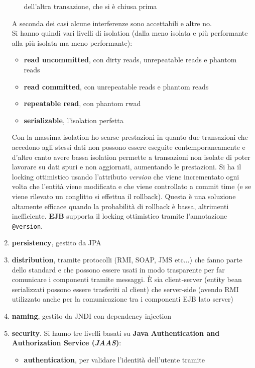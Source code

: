 \documentclass[a4paper,12pt, oneside]{book}
\begin{document}
\begin{enumerate}
\begin{itemize}
    dell'altra transazione, che si è chiusa prima 
  \end{itemize}
  A seconda dei casi alcune interferenze sono accettabili e altre no.\\
  Si hanno quindi vari livelli di isolation (dalla meno isolata e più
  performante alla più isolata ma meno performante):
  \begin{itemize}
    \item \textbf{read uncommitted}, con dirty reads, unrepeatable reads e
    phantom reads 
    \item \textbf{read committed}, con unrepeatable reads e phantom reads 
    \item \textbf{repeatable read}, con phantom rwad
    \item \textbf{serializable}, l'isolation perfetta
  \end{itemize}
  Con la massima isolation ho scarse prestazioni in quanto due transazioni che
  accedono agli stessi dati non possono essere eseguite contemporaneamente e
  d'altro canto avere bassa isolation permette a transazioni non isolate di
  poter lavorare su dati spuri e non aggiornati, aumentando le prestazioni. Si
  ha il locking ottimistico usando
  l'attributo \textit{version} che viene incrementato ogni volta che l'entità
  viene  modificata e che viene controllato a commit time (e se viene rilevato
  un conglitto si effettua il rollback). Questa è una soluzione altamente
  efficace quando la probabilità di rollback è bassa, altrimenti inefficiente.
  \textbf{EJB} supporta il locking ottimistico tramite l'annotazione
  \texttt{@version}.
  \item \textbf{persistency}, gestito da JPA
  \item \textbf{distribution}, tramite protocolli (RMI, SOAP, JMS
  etc$\ldots$) che fanno parte 
  dello standard e che possono essere usati in modo trasparente per far
  comunicare i componenti tramite messaggi. È sia client-server (entity bean
  serializzati possono essere trasferiti al client) che server-side (avendo RMI
  utilizzato anche per la comunicazione tra i componenti EJB lato server) 
  \item \textbf{naming}, gestito da JNDI con dependency injection
  \item \textbf{security}. Si hanno tre livelli basati su \textbf{Java
    Authentication and Authorization Service (\textit{JAAS})}:
  \begin{itemize}
    \item \textbf{authentication}, per validare l'identità dell'utente tramite

\end{itemize}
\end{enumerate}
\end{document}
